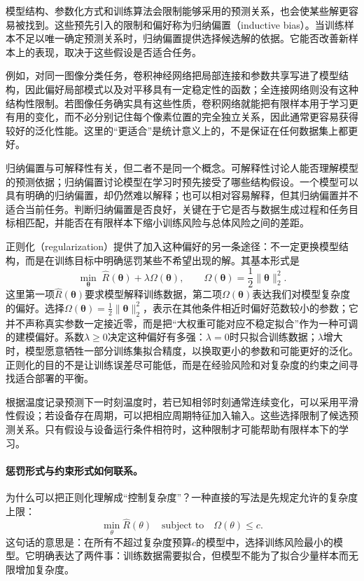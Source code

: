 模型结构、参数化方式和训练算法会限制能够采用的预测关系，也会使某些解更容易被找到。这些预先引入的限制和偏好称为归纳偏置（inductive bias）。当训练样本不足以唯一确定预测关系时，归纳偏置提供选择候选解的依据。它能否改善新样本上的表现，取决于这些假设是否适合任务。

例如，对同一图像分类任务，卷积神经网络把局部连接和参数共享写进了模型结构，因此偏好局部模式以及对平移具有一定稳定性的函数；全连接网络则没有这种结构性限制。若图像任务确实具有这些性质，卷积网络就能把有限样本用于学习更有用的变化，而不必分别记住每个像素位置的完全独立关系，因此通常更容易获得较好的泛化性能。这里的“更适合”是统计意义上的，不是保证在任何数据集上都更好。

归纳偏置与可解释性有关，但二者不是同一个概念。可解释性讨论人能否理解模型的预测依据；归纳偏置讨论模型在学习时预先接受了哪些结构假设。一个模型可以具有明确的归纳偏置，却仍然难以解释；也可以相对容易解释，但其归纳偏置并不适合当前任务。判断归纳偏置是否良好，关键在于它是否与数据生成过程和任务目标相匹配，并能否在有限样本下缩小训练风险与总体风险之间的差距。

正则化（regularization）提供了加入这种偏好的另一条途径：不一定更换模型结构，而是在训练目标中明确惩罚某些不希望出现的解。其基本形式是
\begin{equation}
 \min_{\bm{\theta}}\;\hat{R}(\bm{\theta})+\lambda\Omega(\bm{\theta}),
 \qquad \Omega(\bm{\theta})=\frac12\|\bm{\theta}\|_2^2.\label{eq:foundations-regularized-risk}
\end{equation}
这里第一项$\hat R(\bm{\theta})$要求模型解释训练数据，第二项$\Omega(\bm{\theta})$表达我们对模型复杂度的偏好。选择$\Omega(\bm{\theta})=\frac12\|\bm{\theta}\|_2^2$，表示在其他条件相近时偏好范数较小的参数；它并不声称真实参数一定接近零，而是把“大权重可能对应不稳定拟合”作为一种可调的建模偏好。系数$\lambda\geq0$决定这种偏好有多强：$\lambda=0$时只拟合训练数据；$\lambda$增大时，模型愿意牺牲一部分训练集拟合精度，以换取更小的参数和可能更好的泛化。正则化的目的不是让训练误差尽可能低，而是在经验风险和对复杂度的约束之间寻找适合部署的平衡。

\begin{example}
 根据温度记录预测下一时刻温度时，若已知相邻时刻通常连续变化，可以采用平滑性假设；若设备存在周期，可以把相应周期特征加入输入。这些选择限制了候选预测关系。只有假设与设备运行条件相符时，这种限制才可能帮助有限样本下的学习。
\end{example}

\paragraph{惩罚形式与约束形式如何联系。}
为什么可以把正则化理解成“控制复杂度”？一种直接的写法是先规定允许的复杂度上限：
\begin{equation}
 \min_{\theta}\hat R(\theta)\quad\text{subject to}\quad \Omega(\theta)\leq c.
\end{equation}
这句话的意思是：在所有不超过复杂度预算$c$的模型中，选择训练风险最小的模型。它明确表达了两件事：训练数据需要拟合，但模型不能为了拟合少量样本而无限增加复杂度。

